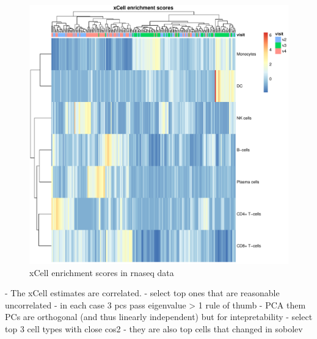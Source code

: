 \begin{figure}
    \centering
    \includegraphics[width=1.0\textwidth,page=1]{mainmatter/figures/chapter_03/get_xCell_estimates.dataset_rnaseq.plots.pdf}
    \caption{xCell enrichment scores in rnaseq data}
    \label{fig:hird_xCell_scores_heatmap_rnaseq}
\end{figure}

- The xCell estimates are correlated.
- select top ones that are reasonable uncorrelated
- in each case 3 pcs pass eigenvalue > 1 rule of thumb
- PCA them
PCs are orthogonal (and thus linearly independent)
but for intepretability
- select top 3 cell types with close cos2
    - they are also top cells that changed in sobolev


